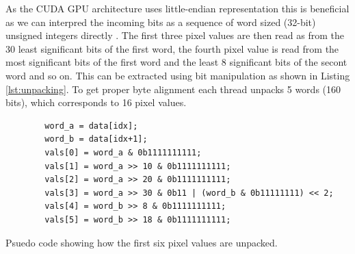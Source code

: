 As the CUDA GPU architecture uses little-endian representation this is beneficial as we can interpred the incoming bits as a sequence of word sized (32-bit) unsigned integers directly \cite[127]{CUDAProgrammingGuide}.
The first three pixel values are then read as from the 30 least significant bits of the first word, the fourth pixel value is read from the most significant bits of the first word and the least 8 significant bits of the secont word and so on.
This can be extracted using bit manipulation as shown in Listing \ref{lst:unpacking}.
To get proper byte alignment each thread unpacks 5 words (160 bits), which corresponds to 16 pixel values.

\begin{listing}[H]
    \begin{verbatim}
        word_a = data[idx];
        word_b = data[idx+1];
        vals[0] = word_a & 0b1111111111;
        vals[1] = word_a >> 10 & 0b1111111111;
        vals[2] = word_a >> 20 & 0b1111111111;
        vals[3] = word_a >> 30 & 0b11 | (word_b & 0b11111111) << 2;
        vals[4] = word_b >> 8 & 0b1111111111;
        vals[5] = word_b >> 18 & 0b1111111111;
    \end{verbatim}
    \caption{Psuedo code showing how the first six pixel values are unpacked.}
    \label{lst:unpacking}
\end{listing}


